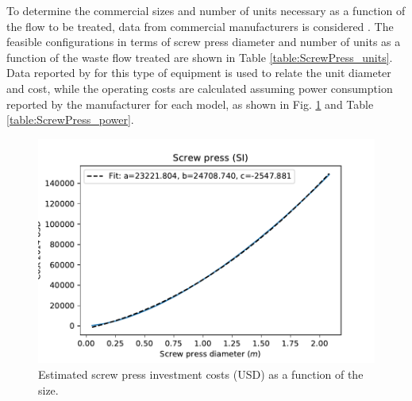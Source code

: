 \begin{refsection}[referencesCh4]
To determine the commercial sizes and number of units necessary as a function of the flow to be treated, data from commercial manufacturers is considered \citep{PWTech}. The feasible configurations in terms of screw press diameter and number of units as a function of the waste flow treated are shown in Table \ref{table:ScrewPress_units}. Data reported by \citet{Matches} for this type of equipment is used to relate the unit diameter and cost, while the operating costs are calculated assuming power consumption reported by the manufacturer for each model, as shown in Fig. \ref{fig:screwpress_investment_costs} and Table \ref{table:ScrewPress_power}.
\begin{table}[h] 
		\centering
		\caption{Sizing estimated for screw press units based commercial on data \protect\citep{PWTech}} \label{table:ScrewPress_units}
\end{table}

\begin{figure}[h]
	\centering
	\includegraphics[width=0.5\linewidth, trim={0.5cm 0cm 0cm 0cm},clip]{gfx/AppendixC/screwpress_cost_m} 
	\caption{Estimated screw press investment costs (USD) as a function of the size.}
	\label{fig:screwpress_investment_costs}
\end{figure}


\end{refsection}
